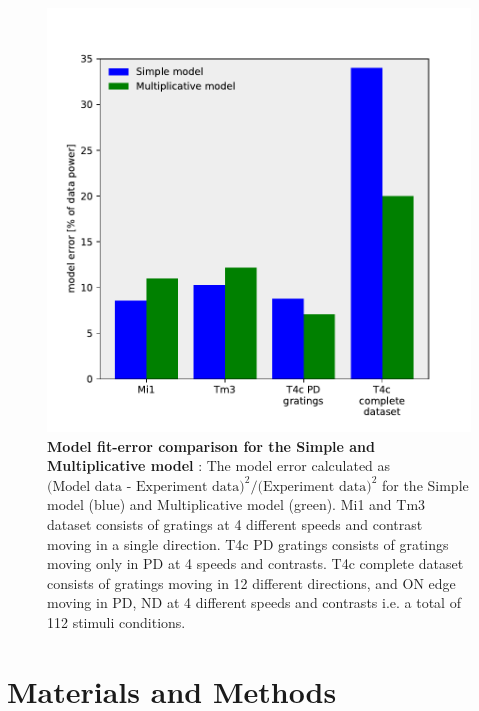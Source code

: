 \documentclass[9pt,lineno]{elife}
\begin{document}
\begin{figure}
\begin{fullwidth}
\includegraphics[width=0.84\linewidth]{figure10}
\caption{\textbf{Model fit-error comparison for the Simple and Multiplicative model} : The model error calculated as $\text{(Model data - Experiment data)}^2 / \text{(Experiment data)}^2$ for the Simple model (blue) and Multiplicative model (green). Mi1 and Tm3 dataset consists of gratings at 4 different speeds and contrast moving in a single direction. T4c PD gratings consists of gratings moving only in PD at 4 speeds and contrasts. T4c complete dataset consists of gratings moving in 12 different directions, and ON edge moving in PD, ND at 4 different speeds and contrasts i.e. a total of 112 stimuli conditions.}

\label{FitError}
	
\end{fullwidth}
\end{figure} 




\section{Materials and Methods}
\end{document}
